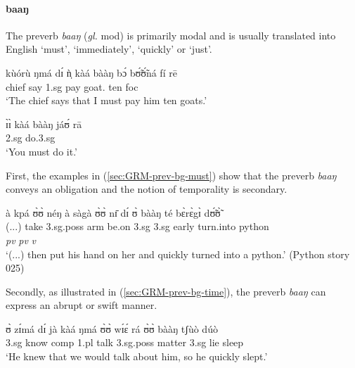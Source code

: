 \begin{exe}
\begin{exe}
\begin{exe}
{\begin{exe}
\begin{exe}
\begin{exe}
\begin{exe}
\begin{exe}
\begin{exe}
\begin{exe}
\begin{xlist}
\begin{exe}
\begin{exe}
\begin{exe}
\begin{exe}
\begin{exe}
\begin{exe}
\begin{exe}
\begin{exe}
\begin{exe}
\begin{exe}
\begin{exe}
\begin{exe}
\begin{exe}
\begin{exe}
\paragraph{baaŋ}
\label{sec:GRM-preverb-baang}

 The preverb  {\it baaŋ}  ({\it gl.} {\sc mod})  is primarily modal and is  
usually translated into English `must', `immediately', `quickly'  or `just'. 


\ea\label{sec:GRM-prev-bg-must}
\ea\label{ex:GRM-7.17}
\gll  kùórù ŋmá dɪ́ ǹ̩ kàá bààŋ bɔ́ bʊ̃́ʊ̃́ná  fí rē \\
 chief say {\comp} {\sc 1.sg} {\fut} {\mod}   pay  goat.{\pl} ten {\sc foc} \\
\glt  `The chief says that I must pay him ten goats.' 

\ex\label{ex:GRM-14.3}
\gll  ɪ̀ɪ̀ kàá bààŋ jáʊ́ rā\\
{\sc 2.sg} {\fut} {\mod} do.{\sc 3.sg} {\foc}\\
\glt  `You must do it.'

 \z 
 \z
 
 First, the examples in (\ref{sec:GRM-prev-bg-must}) show that  the preverb  
{\it baaŋ} conveys an obligation and the notion of temporality is secondary. 


\ea\label{sec:GRM-prev-bg-time}
 à kpá ʊ̀ʊ̀ néŋ à sàgà ʊ̀ʊ̀ nɪ̄ dɪ́ ʊ̀ bààŋ té 
bɛ̀rɛ̀gɪ̀ dʊ̃́ʊ̃̀\\
     {(...})  {\conn}  take {\sc 3.sg.poss} arm {\conn} {be.on} {\sc
3.sg}  {\postp} {\conn} {\sc 3.sg} {\mod} {early} turn.into python \\
{} {} {} {} {} {} {} {} {} {} {} {\it pv} {\it pv} {\it v} {} \\

\glt  `(...) then put his hand on her  and quickly turned into
a python.' (Python story 025)
\z
      
      Secondly, as illustrated in (\ref{sec:GRM-prev-bg-time}),  the preverb  
{\it baaŋ} can express an  abrupt or
swift   manner. 




 \ea\label{ex:GRM-prev-bg-excerpt}
\ea\label{ex:FUS-mod}
\gll  ʊ̀ zɪ́má dɪ́ jà kàá ŋmá ʊ̀ʊ̀ wɪ́ɛ́ rá ʊ̀ʊ̀ bààŋ tʃùò dúò\\
 {\sc 3.sg}  know {\sc comp}  {\sc 1.pl}  {\fut} talk   {\sc 3.sg.poss} matter 
{\foc} {\sc 3.sg} {\mod} lie sleep  \\
\glt  `He knew that we would talk about him, so he quickly slept.'


\end{exe}
\end{exe}
\end{exe}
\end{exe}
\end{exe}
\end{exe}
\end{exe}
\end{exe}
\end{exe}
\end{exe}
\end{exe}
\end{exe}
\end{exe}
\end{exe}
\end{xlist}
\end{exe}
\end{exe}
\end{exe}
\end{exe}
\end{exe}
\end{exe}
\end{exe}}
\end{exe}
\end{exe}
\end{exe}
